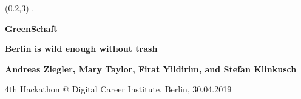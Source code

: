 \begin{textblock}{27}(0.2,3)
{\white .}

\vspace{1mm}

\begin{center}
{\Huge \bf \sf \color{dgreen} GreenSchaft}

\vspace{20mm}

{\LARGE \bf \sf \color{dgreen} Berlin is wild enough without trash}

\vspace{10mm}

{\LARGE \bf Andreas Ziegler, Mary Taylor, Firat Yildirim, and Stefan Klinkusch}

\vspace{20mm}

{\large 4th Hackathon @ Digital Career Institute, Berlin, 30.04.2019}

\vspace{10mm}


\end{center}

\end{textblock}

\ \newpage

